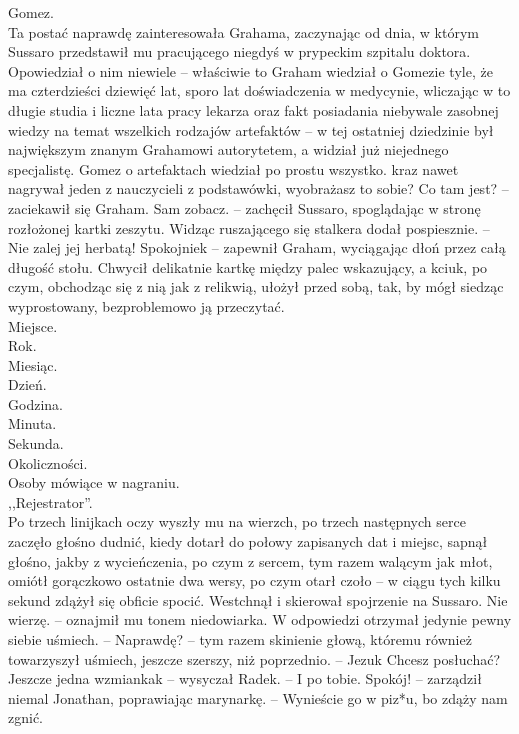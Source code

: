 \documentclass[../MAIN.tex]{subfiles}
\begin{document}
\qd
Gomez.\\
Ta postać naprawdę zainteresowała Grahama, zaczynając od dnia, w którym Sussaro przedstawił mu pracującego niegdyś w prypeckim szpitalu doktora. Opowiedział o nim niewiele -- właściwie to Graham wiedział o Gomezie tyle, że ma czterdzieści dziewięć lat, sporo lat doświadczenia w medycynie, wliczając w to długie studia i liczne lata pracy lekarza oraz fakt posiadania niebywale zasobnej wiedzy na temat wszelkich rodzajów artefaktów -- w tej ostatniej dziedzinie był największym znanym Grahamowi autorytetem, a widział już niejednego specjalistę. Gomez o artefaktach wiedział po prostu wszystko.
\sx \3kraz nawet nagrywał jeden z nauczycieli z podstawówki, wyobrażasz to sobie?
\xx Co tam jest? -- zaciekawił się Graham.
\xx Sam zobacz. -- zachęcił Sussaro, spoglądając w stronę rozłożonej kartki zeszytu. Widząc ruszającego się stalkera dodał pospiesznie. -- Nie zalej jej herbatą!
\xx Spokojnie\3k -- zapewnił Graham, wyciągając dłoń przez całą długość stołu.
\qd
Chwycił delikatnie kartkę między palec wskazujący, a kciuk, po czym, obchodząc się z nią jak z relikwią, ułożył przed sobą, tak, by mógł siedząc wyprostowany, bezproblemowo ją przeczytać.\\
Miejsce.\\
Rok.\\
Miesiąc.\\
Dzień.\\
Godzina.\\
Minuta.\\
Sekunda.\\
Okoliczności.\\
Osoby mówiące w nagraniu.\\
,,Rejestrator''.\\
Po trzech linijkach oczy wyszły mu na wierzch, po trzech następnych serce zaczęło głośno dudnić, kiedy dotarł do połowy zapisanych dat i miejsc, sapnął głośno, jakby z wycieńczenia, po czym z sercem, tym razem walącym jak młot, omiótł gorączkowo ostatnie dwa wersy, po czym otarł czoło -- w ciągu tych kilku sekund zdążył się obficie spocić. Westchnął i skierował spojrzenie na Sussaro.
\sx Nie wierzę. -- oznajmił mu tonem niedowiarka. W odpowiedzi otrzymał jedynie pewny siebie uśmiech. -- Naprawdę? -- tym razem skinienie głową, któremu również towarzyszył uśmiech, jeszcze szerszy, niż poprzednio. -- Jezu\3k
\xx Chcesz posłuchać?
\qd
% 
% 
% 
% 
\sx Jeszcze jedna wzmianka\3k -- wysyczał Radek. -- I po tobie.
\xx Spokój! -- zarządził niemal Jonathan, poprawiając marynarkę. -- Wynieście go w piz*u, bo zdąży nam zgnić.
\end{document}
